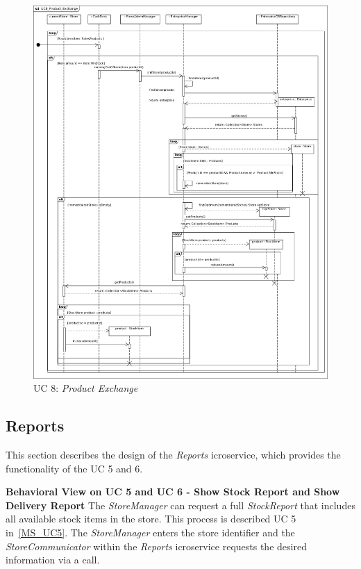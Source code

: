			\begin{figure}[!h]
				\centering
				\includegraphics[width = .9\textwidth]{img/UC8_Product_Exchange.jpg}
				\caption{UC 8: \textit{Product Exchange}}
				\label{MS_UC8}
			\end{figure}
		\FloatBarrier	
		
		\subsection{Reports}
		This section describes the design of the \textit{Reports} icroservice, which provides the functionality of the UC 5 and 6.
		
		\textbf{Behavioral View on UC 5 and UC 6 - Show Stock Report and Show Delivery Report} 
		The \textit{StoreManager} can request a full \textit{StockReport} that includes all available stock items in the store. 
		This process is described  UC 5 in~\ref{MS_UC5}. 
		The \textit{StoreManager} enters the store identifier and the \textit{StoreCommunicator} within the \textit{Reports} icroservice requests the desired information via a  call.
		
